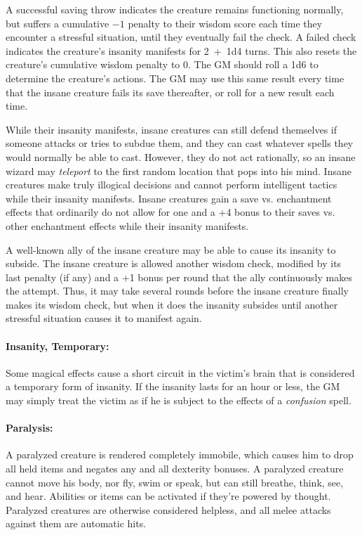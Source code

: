 \begin{multicols}{2}
A successful saving throw indicates the creature remains functioning normally, but suffers a cumulative $-1$ penalty to their wisdom score each time they encounter a stressful situation, until they eventually fail the check.  A failed check indicates the creature's insanity manifests for 2~+~1d4 turns.  This also resets the creature's cumulative wisdom penalty to 0.  The GM should roll a 1d6 to determine the creature's actions.  The GM may use this same result every time that the insane creature fails its save thereafter, or roll for a new result each time.

While their insanity manifests, insane creatures can still defend themselves if someone attacks or tries to subdue them, and they can cast whatever spells they would normally be able to cast.  However, they do not act rationally, so an insane wizard may \textit{teleport} to the first random location that pops into his mind.  Insane creatures make truly illogical decisions and cannot perform intelligent tactics while their insanity manifests.  Insane creatures gain a save vs. enchantment effects that ordinarily do not allow for one and a +4 bonus to their saves vs. other enchantment effects while their insanity manifests.

A well-known ally of the insane creature may be able to cause its insanity to subside.  The insane creature is allowed another wisdom check, modified by its last penalty (if any) and a +1 bonus per round that the ally continuously makes the attempt.  Thus, it may take several rounds before the insane creature finally makes its wisdom check, but when it does the insanity subsides until another stressful situation causes it to manifest again.

\paragraph{Insanity, Temporary:} Some magical effects cause a short circuit in the victim's brain that is considered a temporary form of insanity.  If the insanity lasts for an hour or less, the GM may simply treat the victim as if he is subject to the effects of a \textit{confusion} spell.

\paragraph{Paralysis:} A paralyzed creature is rendered completely immobile, which causes him to drop all held items and negates any and all dexterity bonuses.  A paralyzed creature cannot move his body, nor fly, swim or speak, but can still breathe, think, see, and hear.  Abilities or items can be activated if they're powered by thought.  Paralyzed creatures are otherwise considered helpless, and all melee attacks against them are automatic hits.


\end{multicols}
